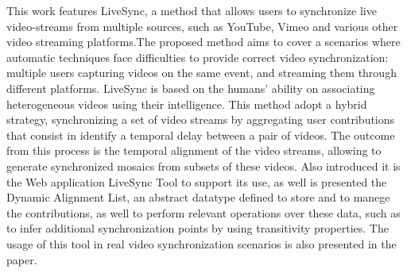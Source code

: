 This work features LiveSync, a method that allows users to synchronize live video-streams from multiple sources, such as YouTube, Vimeo and various other video streaming platforms.The proposed method aims to cover a scenarios where automatic techniques face difficulties to provide correct video synchronization: multiple users capturing videos on the same event, and streaming them through different platforms. LiveSync is based on the humans' ability on associating heterogeneous videos using their intelligence. This method adopt a hybrid strategy, synchronizing a set of video streams by aggregating user contributions that consist in identify a temporal delay between a pair of videos. The outcome from this process is the temporal alignment of the video streams, allowing to generate synchronized mosaics from subsets of these videos.  Also introduced it is the Web application LiveSync Tool to support its use, as well is presented the Dynamic Alignment List, an abstract datatype defined to store and to manege the contributions, as well to perform relevant operations over these data, such as to infer additional synchronization points by using transitivity properties. The usage of this tool in real video synchronization scenarios is also presented in the paper.  
